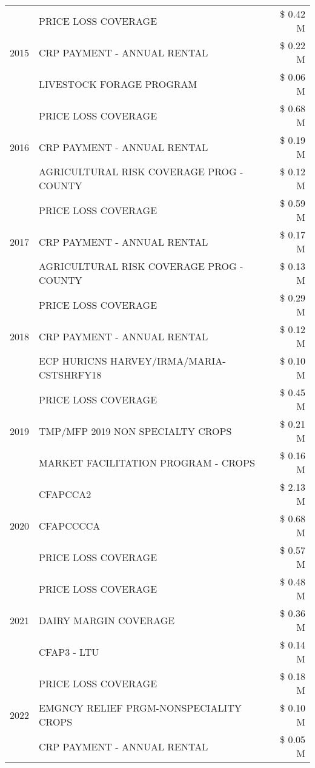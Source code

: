 \begin{tabular}{llr}
\cline{1-3}
\multirow[t]{3}{*}{2015} & PRICE LOSS COVERAGE & \$ 0.42 M \\
 & CRP PAYMENT - ANNUAL RENTAL & \$ 0.22 M \\
 & LIVESTOCK FORAGE PROGRAM & \$ 0.06 M \\
\cline{1-3}
\multirow[t]{3}{*}{2016} & PRICE LOSS COVERAGE & \$ 0.68 M \\
 & CRP PAYMENT - ANNUAL RENTAL & \$ 0.19 M \\
 & AGRICULTURAL RISK COVERAGE PROG - COUNTY & \$ 0.12 M \\
\cline{1-3}
\multirow[t]{3}{*}{2017} & PRICE LOSS COVERAGE & \$ 0.59 M \\
 & CRP PAYMENT - ANNUAL RENTAL & \$ 0.17 M \\
 & AGRICULTURAL RISK COVERAGE PROG - COUNTY & \$ 0.13 M \\
\cline{1-3}
\multirow[t]{3}{*}{2018} & PRICE LOSS COVERAGE & \$ 0.29 M \\
 & CRP PAYMENT - ANNUAL RENTAL & \$ 0.12 M \\
 & ECP HURICNS HARVEY/IRMA/MARIA-CSTSHRFY18 & \$ 0.10 M \\
\cline{1-3}
\multirow[t]{3}{*}{2019} & PRICE LOSS COVERAGE & \$ 0.45 M \\
 & TMP/MFP 2019 NON SPECIALTY CROPS & \$ 0.21 M \\
 & MARKET FACILITATION PROGRAM - CROPS & \$ 0.16 M \\
\cline{1-3}
\multirow[t]{3}{*}{2020} & CFAPCCA2 & \$ 2.13 M \\
 & CFAPCCCCA & \$ 0.68 M \\
 & PRICE LOSS COVERAGE & \$ 0.57 M \\
\cline{1-3}
\multirow[t]{3}{*}{2021} & PRICE LOSS COVERAGE & \$ 0.48 M \\
 & DAIRY MARGIN COVERAGE & \$ 0.36 M \\
 & CFAP3 - LTU & \$ 0.14 M \\
\cline{1-3}
\multirow[t]{3}{*}{2022} & PRICE LOSS COVERAGE & \$ 0.18 M \\
 & EMGNCY RELIEF PRGM-NONSPECIALITY CROPS & \$ 0.10 M \\
 & CRP PAYMENT - ANNUAL RENTAL & \$ 0.05 M \\
\cline{1-3}
\bottomrule
\end{tabular}
